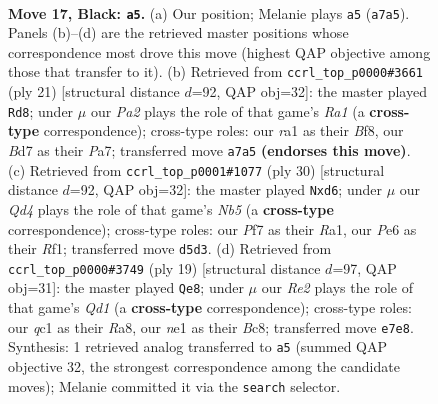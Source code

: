 \documentclass[11pt]{article}
\begin{document}
\clearpage

\begin{figure}[p]\centering
\begin{subfigure}{0.46\textwidth}\centering
\resizebox{\linewidth}{!}{%
\newchessgame
\chessboard[
  setfen={r5k1/p2brppp/4pn2/2pq4/n7/3BP1P1/PP3RPP/RNQ1N1K1 b - - 3 17},
  showmover=false,
  pgfstyle=straightmove, color=movearrow, markmove={a7-a5}
]}
\caption{}
\end{subfigure}\hfill
\begin{subfigure}{0.46\textwidth}\centering
\resizebox{\linewidth}{!}{%
\newchessgame
\chessboard[
  setfen={r3kb1r/pp3ppp/2nnq3/4p3/2P5/1P3N2/PB3PPP/RN1Q1RK1 b kq - 0 11},
  showmover=false,
  pgfstyle=straightmove, color=movearrow, markmove={a8-d8}
]}
\caption{}
\end{subfigure}
\\[4pt]
\begin{subfigure}{0.46\textwidth}\centering
\resizebox{\linewidth}{!}{%
\newchessgame
\chessboard[
  setfen={rn3rk1/pp1bqp2/3bp1pp/1N6/3P4/P2Q4/1P2NPPP/RB3RK1 w - - 2 16},
  showmover=false,
  pgfstyle=straightmove, color=movearrow, markmove={b5-d6}
]}
\caption{}
\end{subfigure}\hfill
\begin{subfigure}{0.46\textwidth}\centering
\resizebox{\linewidth}{!}{%
\newchessgame
\chessboard[
  setfen={r1bq1rk1/ppp3pp/2np1n2/5p2/2PP3P/2PQ3N/P3PPB1/R1B1K2R b KQ - 6 10},
  showmover=false,
  pgfstyle=straightmove, color=movearrow, markmove={d8-e8}
]}
\caption{}
\end{subfigure}
\caption{\textbf{Move 17, Black: \texttt{a5}.} (a) Our position; Melanie plays \texttt{a5} (\texttt{a7a5}). Panels (b)--(d) are the retrieved master positions whose correspondence most drove this move (highest QAP objective among those that transfer to it). (b) Retrieved from \texttt{ccrl\_top\_p0000\#3661} (ply 21) [structural distance $d$=92, QAP obj=32]: the master played \texttt{Rd8}; under $\mu$ our \emph{Pa2} plays the role of that game's \emph{Ra1} (a \textbf{cross-type} correspondence); cross-type roles: our \emph{r}a1 as their \emph{B}f8, our \emph{B}d7 as their \emph{P}a7; transferred move \texttt{a7a5} \textbf{(endorses this move)}. (c) Retrieved from \texttt{ccrl\_top\_p0001\#1077} (ply 30) [structural distance $d$=92, QAP obj=32]: the master played \texttt{Nxd6}; under $\mu$ our \emph{Qd4} plays the role of that game's \emph{Nb5} (a \textbf{cross-type} correspondence); cross-type roles: our \emph{P}f7 as their \emph{R}a1, our \emph{P}e6 as their \emph{R}f1; transferred move \texttt{d5d3}. (d) Retrieved from \texttt{ccrl\_top\_p0000\#3749} (ply 19) [structural distance $d$=97, QAP obj=31]: the master played \texttt{Qe8}; under $\mu$ our \emph{Re2} plays the role of that game's \emph{Qd1} (a \textbf{cross-type} correspondence); cross-type roles: our \emph{q}c1 as their \emph{R}a8, our \emph{n}e1 as their \emph{B}c8; transferred move \texttt{e7e8}. Synthesis: 1 retrieved analog transferred to \texttt{a5} (summed QAP objective 32, the strongest correspondence among the candidate moves); Melanie committed it via the \texttt{search} selector.}
\label{fig:thought-m33}
\end{figure}
\end{document}
